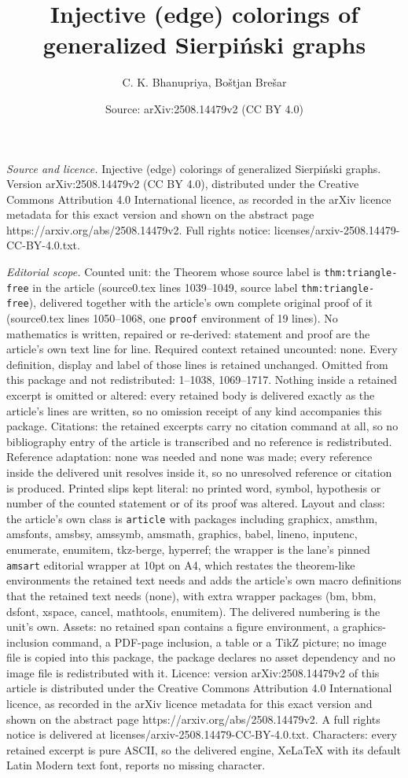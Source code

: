 \documentclass[10pt,a4paper]{amsart}
\title[Injective (edge) colorings of generalized Sierpi\'{n}ski gra]{Injective (edge) colorings of generalized Sierpi\'{n}ski graphs}
\author{C. K. Bhanupriya, Bo\v{s}tjan Bre\v{s}ar}
\date{Source: arXiv:2508.14479v2 (CC BY 4.0)}
\begin{document}
\maketitle

\noindent\emph{Source and licence.} Injective (edge) colorings of generalized Sierpi\'{n}ski graphs. Version arXiv:2508.14479v2 (CC BY 4.0), distributed under the Creative Commons Attribution 4.0 International licence, as recorded in the arXiv licence metadata for this exact version and shown on the abstract page https://arxiv.org/abs/2508.14479v2. Full rights notice: licenses/arxiv-2508.14479-CC-BY-4.0.txt.\par\smallskip

\noindent\textit{Editorial scope.} Counted unit: the Theorem whose source label is \texttt{thm:triangle-free} in the article (source0.tex lines 1039--1049, source label \texttt{thm:triangle-free}), delivered together with the article's own complete original proof of it (source0.tex lines 1050--1068, one \texttt{proof} environment of 19 lines). No mathematics is written, repaired or re-derived: statement and proof are the article's own text line for line. Required context retained uncounted: none. Every definition, display and label of those lines is retained unchanged. Omitted from this package and not redistributed: 1--1038, 1069--1717. Nothing inside a retained excerpt is omitted or altered: every retained body is delivered exactly as the article's lines are written, so no omission receipt of any kind accompanies this package. Citations: the retained excerpts carry no citation command at all, so no bibliography entry of the article is transcribed and no reference is redistributed. Reference adaptation: none was needed and none was made; every reference inside the delivered unit resolves inside it, so no unresolved reference or citation is produced. Printed slips kept literal: no printed word, symbol, hypothesis or number of the counted statement or of its proof was altered. Layout and class: the article's own class is \texttt{article} with packages including graphicx, amsthm, amsfonts, amsbsy, amssymb, amsmath, graphics, babel, lineno, inputenc, enumerate, enumitem, tkz-berge, hyperref; the wrapper is the lane's pinned \texttt{amsart} editorial wrapper at 10pt on A4, which restates the theorem-like environments the retained text needs and adds the article's own macro definitions that the retained text needs (none), with extra wrapper packages (bm, bbm, dsfont, xspace, cancel, mathtools, enumitem). The delivered numbering is the unit's own. Assets: no retained span contains a figure environment, a graphics-inclusion command, a PDF-page inclusion, a table or a TikZ picture; no image file is copied into this package, the package declares no asset dependency and no image file is redistributed with it. Licence: version arXiv:2508.14479v2 of this article is distributed under the Creative Commons Attribution 4.0 International licence, as recorded in the arXiv licence metadata for this exact version and shown on the abstract page https://arxiv.org/abs/2508.14479v2. A full rights notice is delivered at licenses/arxiv-2508.14479-CC-BY-4.0.txt. Characters: every retained excerpt is pure ASCII, so the delivered engine, XeLaTeX with its default Latin Modern text font, reports no missing character.
\end{document}
